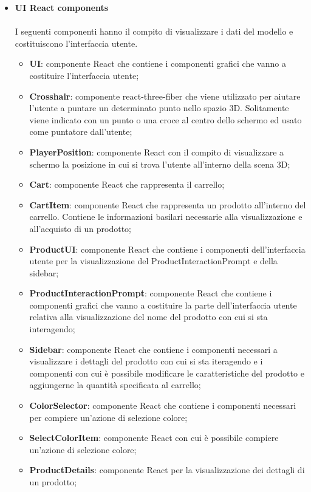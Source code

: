 \begin{itemize}
		\item \textbf{\large UI React components}
		\\\\
		I seguenti componenti hanno il compito di visualizzare i dati del modello e costituiscono l'interfaccia 
		utente. 
		\begin{itemize}
			\item \textbf{UI}: componente React che contiene i componenti grafici che vanno a costituire l'interfaccia
			utente; 
			\item \textbf{Crosshair}: componente react-three-fiber che viene utilizzato per aiutare l'utente a puntare
			un determinato punto nello spazio 3D.
			Solitamente viene indicato con un punto o una croce al centro dello schermo ed usato come puntatore dall'utente;
			\item \textbf{PlayerPosition}: componente React con il compito di visualizzare a schermo la posizione in cui 
			si trova l'utente all'interno della scena 3D;
			\item \textbf{Cart}: componente React che rappresenta il carrello;
			\item \textbf{CartItem}: componente React che rappresenta un prodotto all'interno del carrello.
			Contiene le informazioni basilari necessarie alla visualizzazione e all'acquisto di un prodotto;
			\item \textbf{ProductUI}:  componente React che contiene i componenti dell'interfaccia utente per la visualizzazione
			del ProductInteractionPrompt e della sidebar;
			\item \textbf{ProductInteractionPrompt}: componente React che contiene i componenti grafici che vanno a costituire 
			la parte dell'interfaccia utente relativa alla visualizzazione del nome del prodotto con cui si sta interagendo;
			\item \textbf{Sidebar}: componente React che contiene i componenti necessari a visualizzare i 
			dettagli del prodotto con cui si sta iteragendo e i componenti con cui è possibile modificare le caratteristiche del 
			prodotto e aggiungerne la quantità specificata al carrello;
			\item \textbf{ColorSelector}: componente React che contiene i componenti necessari per compiere un'azione di selezione colore;
			\item \textbf{SelectColorItem}: componente React con cui è possibile compiere un'azione di selezione colore;
			\item \textbf{ProductDetails}: componente React per la visualizzazione dei dettagli di un prodotto;

\end{itemize}
\end{itemize}
